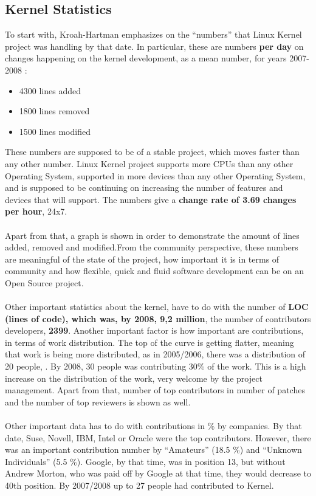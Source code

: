 \documentclass[11pt]{article}
\begin{document}
\subsection{Kernel Statistics}
To start with, Kroah-Hartman emphasizes on the ``numbers'' that Linux Kernel project was handling by that date. In particular, these are numbers \textbf{per day} on changes happening on the kernel development, as a mean number, for years 2007-2008 :
\begin{itemize}\itemsep0pt
\item{4300 lines added}
\item{1800 lines removed}
\item{1500 lines modified}
\end{itemize}
These numbers are supposed to be of a stable project, which moves faster than any other number. Linux Kernel project supports more CPUs than any other Operating System, supported in more devices than any other Operating System, and is supposed to be continuing on increasing the number of features and devices that will support. The numbers give a \textbf{change rate of 3.69 changes per hour}, 24x7.\\
\\
Apart from that, a graph is shown in order to demonstrate the amount of lines added, removed and modified.From the community perspective, these numbers are meaningful of the state of the project, how important it is in terms of community and how flexible, quick and fluid software development can be on an Open Source project.\\
\\
Other important statistics about the kernel, have to do with the number of \textbf{LOC (lines of code), which was, by 2008, 9,2 million}, the number of contributors developers, \textbf{2399}. Another important factor is how important are contributions, in terms of work distribution. The top of the curve is getting flatter, meaning that work is being more distributed, as in 2005/2006, there was a distribution of 20 people, . By 2008, 30 people was contributing 30\% of the work. This is a high increase on the distribution of the work, very welcome by the project management. Apart from that, number of top contributors in number of patches and the number of top reviewers is shown as well.\\
\\
Other important data has to do with contributions in \% by companies. By that date, Suse, Novell, IBM, Intel or Oracle were the top contributors. However, there was an important contribution number by ``Amateurs'' (18.5 \%) and ``Unknown Individuals'' (5.5 \%). Google, by that time, was in position 13, but without Andrew Morton, who was paid off by Google at that time, they would decrease to 40th position. By 2007/2008 up to 27 people had contributed to Kernel.
\end{document}
